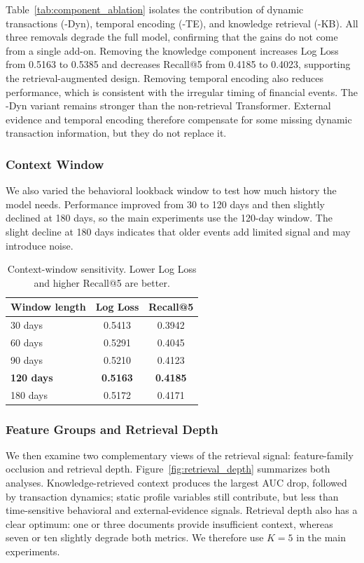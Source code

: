 \documentclass[runningheads]{llncs}
\newcommand{\best}[1]{\textbf{#1}}
\begin{document}
Table~\ref{tab:component_ablation} isolates the contribution of dynamic transactions (-Dyn), temporal encoding (-TE), and knowledge retrieval (-KB). All three removals degrade the full model, confirming that the gains do not come from a single add-on. Removing the knowledge component increases Log Loss from 0.5163 to 0.5385 and decreases Recall@5 from 0.4185 to 0.4023, supporting the retrieval-augmented design. Removing temporal encoding also reduces performance, which is consistent with the irregular timing of financial events. The -Dyn variant remains stronger than the non-retrieval Transformer. External evidence and temporal encoding therefore compensate for some missing dynamic transaction information, but they do not replace it.

\subsubsection{Context Window}
We also varied the behavioral lookback window to test how much history the model needs. Performance improved from 30 to 120 days and then slightly declined at 180 days, so the main experiments use the 120-day window. The slight decline at 180 days indicates that older events add limited signal and may introduce noise.

\begin{table}[H]
\centering
\scriptsize
\caption{Context-window sensitivity. Lower Log Loss and higher Recall@5 are better.}
\label{tab:context_window}
\begin{tabular}{lcc}
\toprule
\textbf{Window length} & \textbf{Log Loss} & \textbf{Recall@5} \\
\midrule
30 days & 0.5413 & 0.3942 \\
\rowcolor{tablerowalt}
60 days & 0.5291 & 0.4045 \\
90 days & 0.5210 & 0.4123 \\
\rowcolor{tablerowalt}
\textbf{120 days} & \best{0.5163} & \best{0.4185} \\
180 days & 0.5172 & 0.4171 \\
\bottomrule
\end{tabular}
\end{table}

\subsubsection{Feature Groups and Retrieval Depth}
We then examine two complementary views of the retrieval signal: feature-family occlusion and retrieval depth. Figure~\ref{fig:retrieval_depth} summarizes both analyses. Knowledge-retrieved context produces the largest AUC drop, followed by transaction dynamics; static profile variables still contribute, but less than time-sensitive behavioral and external-evidence signals. Retrieval depth also has a clear optimum: one or three documents provide insufficient context, whereas seven or ten slightly degrade both metrics. We therefore use $K=5$ in the main experiments.
\end{document}
